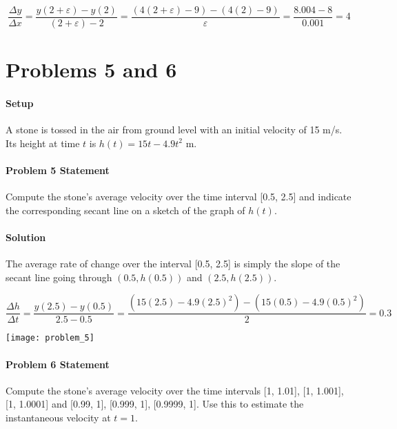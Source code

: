 \documentclass{article}
\begin{document}
  \begin{equation}
    \frac{\Delta{y}}{\Delta{x}} = \frac{y(2 + \varepsilon) - y(2)}{(2 + \varepsilon) - 2} = \frac{(4(2 + \varepsilon) - 9) - (4(2) - 9)}{\varepsilon} = \frac{8.004 - 8}{0.001} = \boxed{4}
  \end{equation}

  \newpage
  \section{Problems 5 and 6}
  \paragraph{Setup} A stone is tossed in the air from ground level with an initial velocity of 15 m/s. Its height at time \(t\) is \(h(t) = 15t - 4.9t^2\) m.
  \paragraph{Problem 5 Statement} Compute the stone's average velocity over the time interval [0.5, 2.5] and indicate the corresponding secant line on a sketch of the graph of \(h(t)\).

  \paragraph{Solution} The average rate of change over the interval [0.5, 2.5] is simply the slope of the secant line going through \((0.5, h(0.5)) \) and \( (2.5, h(2.5)) \).

  \begin{equation}
    \frac{\Delta{h}}{\Delta{t}} = \frac{y(2.5) - y(0.5)}{2.5 - 0.5} = \frac{(15(2.5) - 4.9(2.5)^2) - (15(0.5) - 4.9(0.5)^2)}{2} = \boxed{0.3}
  \end{equation}

  \texttt{[image: problem\_5]}

  \newpage
  \paragraph{Problem 6 Statement} Compute the stone's average velocity over the time intervals [1, 1.01], [1, 1.001], [1, 1.0001] and [0.99, 1], [0.999, 1], [0.9999, 1]. Use this to estimate the instantaneous velocity at \(t=1\).
\end{document}
